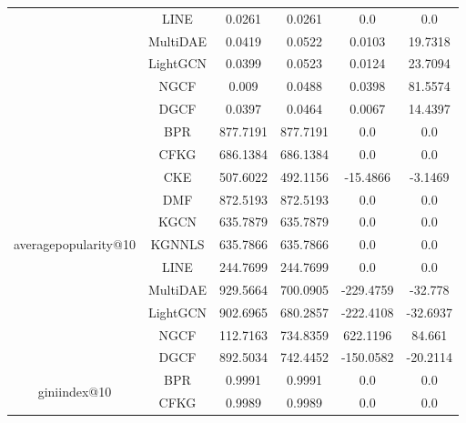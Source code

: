 \begin{table}[H]
{\begin{tabular}{|c|c|c|c|c|c|}
                                      & LINE & 0.0261 & 0.0261 & 0.0 & 0.0 \\ \cline{2-6}
                                      & MultiDAE & 0.0419 & 0.0522 & 0.0103 & 19.7318 \\ \cline{2-6}
                                      & LightGCN & 0.0399 & 0.0523 & 0.0124 & 23.7094 \\ \cline{2-6}
                                      & NGCF & 0.009 & 0.0488 & 0.0398 & 81.5574 \\ \cline{2-6}
                                      & DGCF & 0.0397 & 0.0464 & 0.0067 & 14.4397 \\ \cline{2-6}
            \hline
            \multirow{11}{*}{averagepopularity@10} & BPR & 877.7191 & 877.7191 & 0.0 & 0.0 \\ \cline{2-6}
                                                  & CFKG & 686.1384 & 686.1384 & 0.0 & 0.0 \\ \cline{2-6}
                                                  & CKE & 507.6022 & 492.1156 & -15.4866 & -3.1469 \\ \cline{2-6}
                                                  & DMF & 872.5193 & 872.5193 & 0.0 & 0.0 \\ \cline{2-6}
                                                  & KGCN & 635.7879 & 635.7879 & 0.0 & 0.0 \\ \cline{2-6}
                                                  & KGNNLS & 635.7866 & 635.7866 & 0.0 & 0.0 \\\cline{2-6}
                                                  & LINE & 244.7699 & 244.7699 & 0.0 & 0.0 \\ \cline{2-6}
                                                  & MultiDAE & 929.5664 & 700.0905 & -229.4759 & -32.778 \\ \cline{2-6}
                                                  & LightGCN & 902.6965 & 680.2857 & -222.4108 & -32.6937 \\ \cline{2-6}
                                                  & NGCF & 112.7163 & 734.8359 & 622.1196 & 84.661 \\ \cline{2-6}
                                                  & DGCF & 892.5034 & 742.4452 & -150.0582 & -20.2114 \\ \cline{2-6}
            \hline
            \multirow{11}{*}{giniindex@10} & BPR & 0.9991 & 0.9991 & 0.0 & 0.0 \\ \cline{2-6}
                                            & CFKG & 0.9989 & 0.9989 & 0.0 & 0.0 \\ \cline{2-6}

\end{tabular}}
\end{table}

